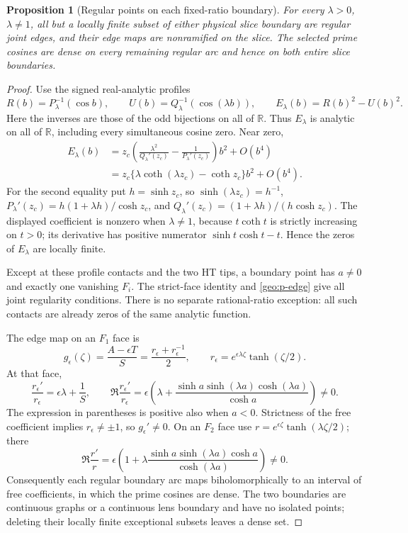\documentclass[11pt]{article}
\numberwithin{equation}{section}
\newtheorem{proposition}[theorem]{Proposition}
\theoremstyle{definition}
\begin{document}
\begin{proposition}[Regular points on each fixed-ratio boundary]\label{geo:slice-density}
For every $\lambda>0$, $\lambda\ne1$, all but a locally finite subset
of either physical slice boundary are regular joint edges, and their
edge maps are nonramified on the slice. The selected prime
cosines are dense on every remaining regular arc and hence on both
entire slice boundaries.
\end{proposition}
\begin{proof}
Use the signed real-analytic profiles
\[
 R(b)=P_\lambda^{-1}(\cos b),\qquad
 U(b)=Q_\lambda^{-1}(\cos(\lambda b)),\qquad
 E_\lambda(b)=R(b)^2-U(b)^2.
\]
Here the inverses are those of the odd bijections on all of $\mathbb R$.
Thus $E_\lambda$ is analytic on all of $\mathbb R$, including every
simultaneous cosine zero.  Near zero,
\begin{align*}
 E_\lambda(b)
 &=z_c\left(\frac{\lambda^2}{Q_\lambda'(z_c)}-
                  \frac1{P_\lambda'(z_c)}\right)b^2+O(b^4)\\
 &=z_c\{\lambda\coth(\lambda z_c)-\coth z_c\}b^2+O(b^4).
\end{align*}
For the second equality put $h=\sinh z_c$, so
$\sinh(\lambda z_c)=h^{-1}$,
$P_\lambda'(z_c)=h(1+\lambda h)/\cosh z_c$, and
$Q_\lambda'(z_c)=(1+\lambda h)/(h\cosh z_c)$.
The displayed coefficient is nonzero when $\lambda\ne1$, because
$t\coth t$ is strictly increasing on $t>0$; its derivative has
positive numerator $\sinh t\cosh t-t$.
Hence the zeros of $E_\lambda$ are locally finite.

Except at these profile contacts and the two HT tips, a boundary
point has $a\ne0$ and exactly one vanishing $F_i$.  The strict-face
identity and \eqref{geo:p-edge} give all joint regularity conditions.
There is no separate rational-ratio exception: all such contacts
are already zeros of the same analytic function.

The edge map on an $F_1$ face is
\begin{equation}\label{geo:slice-edge-maps}
 g_\epsilon(\zeta)=\frac{A-\epsilon T}{S}
   =\frac{r_\epsilon+r_\epsilon^{-1}}2,
 \qquad r_\epsilon=e^{\epsilon\lambda\zeta}\tanh(\zeta/2).
\end{equation}
At that face,
\[
 \frac{r_\epsilon'}{r_\epsilon}=\epsilon\lambda+\frac1S,
 \qquad
 \Re\frac{r_\epsilon'}{r_\epsilon}
 =\epsilon\left(\lambda+
       \frac{\sinh a\sinh(\lambda a)\cosh(\lambda a)}{\cosh a}\right)\ne0.
\]
The expression in parentheses is positive also when $a<0$.
Strictness of the free coefficient implies $r_\epsilon\ne\pm1$,
so $g_\epsilon'\ne0$.  On an $F_2$ face use
$r=e^{\epsilon\zeta}\tanh(\lambda\zeta/2)$; there
\[
 \Re\frac{r'}r=\epsilon\left(1+
 \lambda\frac{\sinh a\sinh(\lambda a)\cosh a}{\cosh(\lambda a)}\right)\ne0.
\]
Consequently each regular boundary arc maps biholomorphically to
an interval of free coefficients, in which the prime cosines are
dense. The two boundaries are continuous graphs or a
continuous lens boundary and have no isolated points; deleting their
locally finite exceptional subsets leaves a dense set.
\end{proof}
\end{document}
